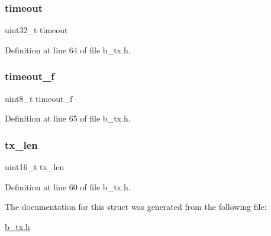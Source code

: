\mbox{\label{structb_t_x___info__t_ab5627d8d8b095c198e2523c44ca380ac}} 
\subsubsection{\texorpdfstring{timeout}{timeout}}
{\footnotesize\ttfamily uint32\+\_\+t timeout}



Definition at line 64 of file b\+\_\+tx.\+h.

\mbox{\label{structb_t_x___info__t_a06a8a7ab5d60a21b5357adad4eb93393}} 
\subsubsection{\texorpdfstring{timeout\+\_\+f}{timeout\_f}}
{\footnotesize\ttfamily uint8\+\_\+t timeout\+\_\+f}



Definition at line 65 of file b\+\_\+tx.\+h.

\mbox{\label{structb_t_x___info__t_abf7d061f271985d073bcf0578093ea45}} 
\subsubsection{\texorpdfstring{tx\+\_\+len}{tx\_len}}
{\footnotesize\ttfamily uint16\+\_\+t tx\+\_\+len}



Definition at line 60 of file b\+\_\+tx.\+h.



The documentation for this struct was generated from the following file\+:\begin{DoxyCompactItemize}
\item 
\mbox{\hyperlink{b__tx_8h}{b\+\_\+tx.\+h}}\end{DoxyCompactItemize}
